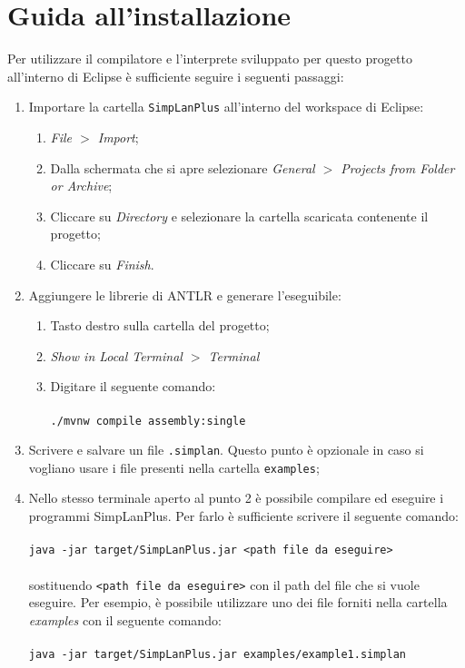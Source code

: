 \documentclass[../report.tex]{subfiles}
\begin{document}
\chapter{Guida all'installazione}\label{a:installazione}
Per utilizzare il compilatore e l'interprete sviluppato per questo progetto all'interno di Eclipse è sufficiente seguire i seguenti passaggi:
\begin{enumerate}
    \item Importare la cartella \verb|SimpLanPlus| all'interno del workspace di Eclipse:
        \begin{enumerate}
            \item \textit{File $>$ Import};
            \item Dalla schermata che si apre selezionare \textit{General $>$ Projects from Folder or Archive};
            \item Cliccare su \textit{Directory} e selezionare la cartella scaricata contenente il progetto;
            \item Cliccare su \textit{Finish}.
        \end{enumerate}
    \item Aggiungere le librerie di ANTLR e generare l'eseguibile:
            \begin{enumerate}
                \item Tasto destro sulla cartella del progetto;
                \item \textit{Show in Local Terminal $>$ Terminal}
                \item Digitare il seguente comando:\\\\
                    \verb|./mvnw compile assembly:single|
            \end{enumerate}
    \item Scrivere e salvare un file \verb|.simplan|. Questo punto è opzionale in caso si vogliano usare i file presenti nella cartella \verb|examples|;
    \item \label{a:pt4}Nello stesso terminale aperto al punto 2 è possibile compilare ed eseguire i programmi SimpLanPlus. Per farlo è sufficiente scrivere il seguente comando:\\\\
        \verb|java -jar target/SimpLanPlus.jar <path file da eseguire>|\\\\
        sostituendo \verb|<path file da eseguire>| con il path del file che si vuole eseguire. Per esempio, è possibile utilizzare uno dei file forniti nella cartella \textit{examples} con il seguente comando:\\\\
        \verb|java -jar target/SimpLanPlus.jar examples/example1.simplan|
\end{enumerate}
\end{document}
